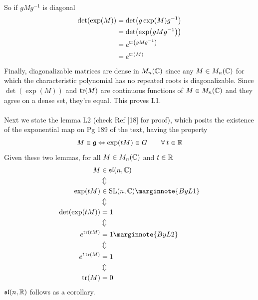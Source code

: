 \documentclass[10pt]{article}
\begin{document}
So if $gMg^{-1}$ is diagonal
$$
\begin{aligned}
	\det(\exp(M)) &= \det(g\exp(M)g^{-1})\\
	&= \det(\exp(gMg^{-1}))\\
	&= e^{\tr(gMg^{-1})}\\
	&= e^{\tr(M)}
\end{aligned}
$$
Finally, diagonalizable matrices are dense in $M_n(\mathbb{C})$ since any $M\in M_n(\mathbb{C})$ for which the characteristic polynomial has no repeated roots is diagonalizable. Since $\det(\exp(M))$ and $\tr(M)$ are continuous functions of $M\in M_n(\mathbb{C})$ and they agree on a dense set, they're equal. This proves L1.\\\\
Next we state the lemma L2 (check Ref [18] for proof), which posits the existence of the exponential map on Pg 189 of the text, having the property
$$
M \in \mathfrak{g} \Leftrightarrow \exp(tM) \in G \qquad \forall\: t\in \mathbb{R}
$$
Given these two lemmas, for all $M\in M_n(\mathbb{C})$ and $t\in \mathbb{R}$
$$
\begin{aligned}
	M &\in \mf{sl}(n,\C)\\
	&\Updownarrow\\
	\exp(tM) &\in \SL(n,\C)\marginnote{By L1}\\
	&\Updownarrow\\
	\det(\exp(tM)) &= 1\\
	&\Updownarrow\\
	e^{\tr(tM)} &= 1\marginnote{By L2}\\
	&\Updownarrow\\
	e^{t\tr(M)} &= 1\\
	&\Updownarrow\\
	\tr(M) &= 0
\end{aligned}
$$
$\mathfrak{sl}(n,\mathbb{R})$ follows as a corollary.
\end{document}

